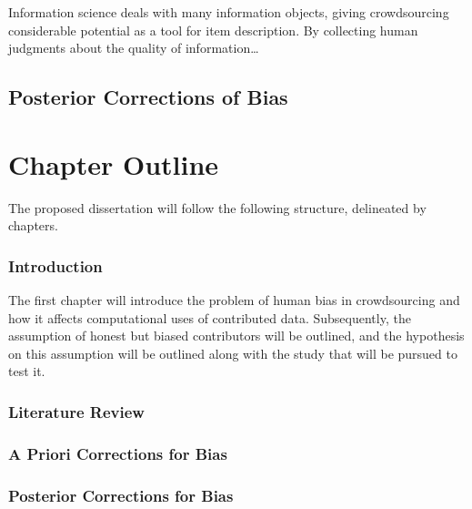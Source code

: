 Information science deals with many information objects, giving
crowdsourcing considerable potential as a tool for item description. By
collecting human judgments about the quality of information\ldots{}

\subsection{Posterior Corrections of
Bias}\label{posterior-corrections-of-bias}

\section{Chapter Outline}\label{chapter-outline}

The proposed dissertation will follow the following structure,
delineated by chapters.

\subsubsection{Introduction}\label{introduction-2}

The first chapter will introduce the problem of human bias in
crowdsourcing and how it affects computational uses of contributed data.
Subsequently, the assumption of honest but biased contributors will be
outlined, and the hypothesis on this assumption will be outlined along
with the study that will be pursued to test it.

\subsubsection{Literature Review}\label{literature-review}

\subsubsection{A Priori Corrections for
Bias}\label{a-priori-corrections-for-bias}

\subsubsection{Posterior Corrections for
Bias}\label{posterior-corrections-for-bias}
